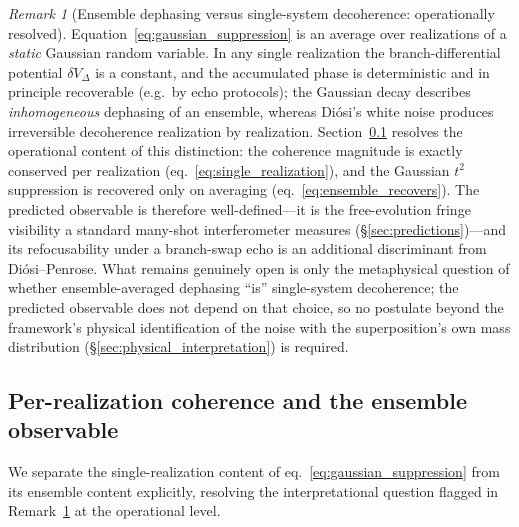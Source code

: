 \documentclass[12pt,a4paper]{article}
\theoremstyle{remark}
\newtheorem{remark}{Remark}
\begin{document}
\begin{remark}[Ensemble dephasing versus single-system decoherence: operationally resolved]
\label{rem:dephasing}
Equation~\eqref{eq:gaussian_suppression} is an average over realizations of a
\emph{static} Gaussian random variable. In any single realization the branch-differential
potential $\delta V_\Delta$ is a constant, and the accumulated phase is deterministic and
in principle recoverable (e.g.\ by echo protocols); the Gaussian decay describes
\emph{inhomogeneous} dephasing of an ensemble, whereas Di\'osi's white noise produces
irreversible decoherence realization by realization. Section~\ref{sec:per_realization}
resolves the operational content of this distinction: the coherence magnitude is exactly
conserved per realization (eq.~\eqref{eq:single_realization}), and the Gaussian $t^2$
suppression is recovered only on averaging (eq.~\eqref{eq:ensemble_recovers}). The
predicted observable is therefore well-defined---it is the free-evolution fringe
visibility a standard many-shot interferometer measures (\S\ref{sec:predictions})---and its
refocusability under a branch-swap echo is an additional discriminant from
Di\'osi--Penrose. What remains genuinely open is only the metaphysical question of whether
ensemble-averaged dephasing ``is'' single-system decoherence; the predicted observable does
not depend on that choice, so no postulate beyond the framework's physical identification
of the noise with the superposition's own mass distribution
(\S\ref{sec:physical_interpretation}) is required.
\end{remark}

\subsection{Per-realization coherence and the ensemble observable}
\label{sec:per_realization}

We separate the single-realization content of eq.~\eqref{eq:gaussian_suppression} from its
ensemble content explicitly, resolving the interpretational question flagged in
Remark~\ref{rem:dephasing} at the operational level.
\end{document}

